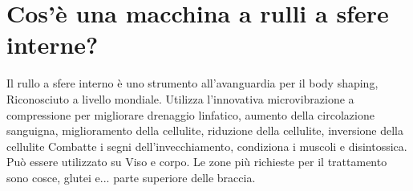 \documentclass[a4paper]{article}
\begin{document}
%	
%	
%	
%	
%	


\section{Cos'è una macchina a rulli a sfere interne?}
Il rullo a sfere interno è uno strumento all'avanguardia per il body shaping, Riconosciuto a livello mondiale. Utilizza l'innovativa microvibrazione a compressione per migliorare drenaggio linfatico, aumento della circolazione sanguigna, miglioramento della cellulite, riduzione della cellulite, inversione della cellulite Combatte i segni dell'invecchiamento, condiziona i muscoli e disintossica. Può essere utilizzato su Viso e corpo. Le zone più richieste per il trattamento sono cosce, glutei e... parte superiore delle braccia.
\end{document}
